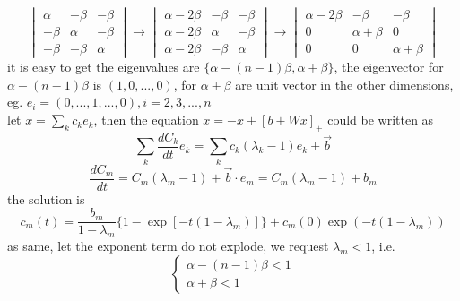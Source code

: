 \documentclass{article}
\begin{document}
\begin{enumerate}
\begin{equation}
              \begin{vmatrix}
                  \alpha & -\beta & -\beta \\
                  -\beta & \alpha & -\beta \\
                  -\beta & -\beta & \alpha
              \end{vmatrix}
              \rightarrow
              \begin{vmatrix}
                  \alpha-2\beta & -\beta & -\beta \\
                  \alpha-2\beta & \alpha & -\beta \\
                  \alpha-2\beta & -\beta & \alpha
              \end{vmatrix}
              \rightarrow
              \begin{vmatrix}
                  \alpha-2\beta & -\beta       & -\beta       \\
                  0             & \alpha+\beta & 0            \\
                  0             & 0            & \alpha+\beta
              \end{vmatrix}
          \end{equation}
          it is easy to get the eigenvalues are $\{\alpha-(n-1)\beta,\alpha+\beta\}$,
          the eigenvector for $\alpha-(n-1)\beta$ is $(1,0,...,0)$,
          for $\alpha+\beta$ are unit vector in the other dimensions, eg. $e_i = (0,...,1,...,0),i = 2,3,...,n$\\
          let $x = \sum_k c_k e_k$, then the equation $\dot{x} = -x +[b+Wx]_+$ could be written as
          $$\sum_k\dfrac{dC_k}{dt}e_k = \sum_k c_k(\lambda_k-1)e_k+\overrightarrow{b}$$
          \begin{equation}
              \dfrac{dC_m}{dt} = C_m(\lambda_m-1)+\overrightarrow{b}\cdot e_m = C_m(\lambda_m-1)+b_m
          \end{equation}
          the solution is
          \begin{equation}
              c_m(t) = \dfrac{b_m}{1-\lambda_m}\{1-\exp[{-t(1-\lambda_m)}]\}+c_m(0)\exp(-t(1-\lambda_m))
          \end{equation}
          as same, let the exponent term do not explode, we request $\lambda_m < 1$, i.e.
          \begin{equation}
              \left\{
              \begin{aligned}
                  \alpha -(n-1)\beta<1 \\
                  \alpha +\beta<1

\end{aligned}
\end{equation}
\end{enumerate}
\end{document}

